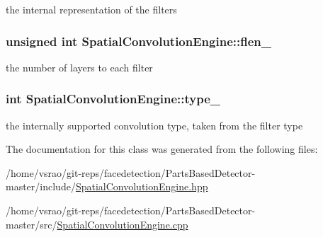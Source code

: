the internal representation of the filters 

\hypertarget{classSpatialConvolutionEngine_a6f03c3cbd7b42d92e4e83148957d5e16}{
\subsubsection[{flen\-\_\-}]{\setlength{\rightskip}{0pt plus 5cm}unsigned int Spatial\-Convolution\-Engine\-::flen\-\_\-\hspace{0.3cm}{\ttfamily [private]}}}\label{classSpatialConvolutionEngine_a6f03c3cbd7b42d92e4e83148957d5e16}


the number of layers to each filter 

\hypertarget{classSpatialConvolutionEngine_a913adab567840b6d1b2407c3b22ca108}{
\subsubsection[{type\-\_\-}]{\setlength{\rightskip}{0pt plus 5cm}int Spatial\-Convolution\-Engine\-::type\-\_\-\hspace{0.3cm}{\ttfamily [private]}}}\label{classSpatialConvolutionEngine_a913adab567840b6d1b2407c3b22ca108}


the internally supported convolution type, taken from the filter type 



The documentation for this class was generated from the following files\-:\begin{DoxyCompactItemize}
\item 
/home/vsrao/git-\/reps/facedetection/\-Parts\-Based\-Detector-\/master/include/\hyperlink{SpatialConvolutionEngine_8hpp}{Spatial\-Convolution\-Engine.\-hpp}\item 
/home/vsrao/git-\/reps/facedetection/\-Parts\-Based\-Detector-\/master/src/\hyperlink{SpatialConvolutionEngine_8cpp}{Spatial\-Convolution\-Engine.\-cpp}\end{DoxyCompactItemize}
